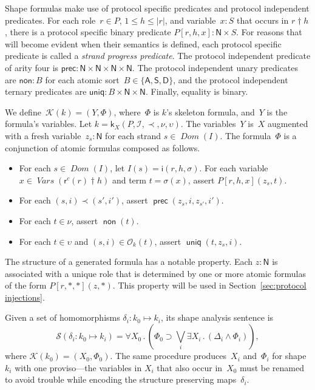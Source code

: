 \documentclass[12pt]{article}
\newcommand{\cn}[1]{\ensuremath{\operatorname{\mathsf{#1}}}}
\newcommand{\fn}[1]{\ensuremath{\operatorname{\mathit{#1}}}}
\newcommand{\srt}[1]{\ensuremath{\mathsf{#1}}}
\newcommand{\typ}{\mathbin:}
\newcommand{\sdom}{\fn{Dom}}
\newcommand{\vars}{\fn{Vars}}
\newcommand{\prefix}[2]{#1\dagger#2}
\newcommand{\all}[1]{\forall#1\mathpunct.}
\newcommand{\some}[1]{\exists#1\mathpunct.}
\newcommand{\form}{\mathcal{K}}
\newcommand{\sent}{\mathcal{S}}
\newcommand{\skel}{\mathsf{k}}
\newcommand{\insta}{\mathsf{i}}
\newcommand{\insts}{\mathcal{I}}
\newcommand{\role}{\mathsf{r}}
\newcommand{\orig}{\mathcal{O}}
\begin{document}
Shape formulas make use of protocol specific predicates and protocol
independent predicates.  For each role~$r\in P$, $1\leq h\leq|r|$, and
variable~$x\typ S$ that occurs in $\prefix{r}{h}$, there is a protocol
specific binary predicate $P[r,h,x]\typ\srt{N}\times S$.  For reasons
that will become evident when their semantics is defined, each
protocol specific predicate is called a \emph{strand progress
  predicate}. The protocol independent predicate of arity four is
$\mathsf{prec}\typ\srt{N}\times\srt{N}\times\srt{N}\times\srt{N}$.
The protocol independent unary predicates are $\mathsf{non}\typ B$ for
each atomic sort~$B\in\{\srt{A}, \srt{S},\srt{D}\}$, and the protocol
independent ternary predicates are $\mathsf{uniq}\typ
B\times\srt{N}\times\srt{N}$.
Finally, equality is binary.

We define~$\form(k)=(Y,\Phi)$, where~$\Phi$ is $k$'s skeleton formula,
and~$Y$ is the formula's variables.  Let
$k=\skel_X(P,\insts,\prec,\nu,\upsilon)$.  The variables~$Y$ is~$X$
augmented with a fresh variable~$z_s\typ\srt{N}$ for each strand
$s\in\sdom(I)$.  The formula~$\Phi$ is a conjunction of atomic
formulas composed as follows.

\begin{itemize}
\item For each $s\in\sdom(I)$, let $I(s)=\insta(r,h,\sigma)$.  For
  each variable $x\in\vars(\prefix{\role^c(r)}{h})$ and term
  $t=\sigma(x)$, assert $P[r,h,x](z_s,t)$.
\item For each $(s,i)\prec(s',i')$, assert
  $\cn{prec}(z_s,i,z_{s'},i')$.
\item For each $t\in\nu$, assert $\cn{non}(t)$.
\item For each $t\in\upsilon$ and $(s,i)\in\orig_k(t)$, assert
  $\cn{uniq}(t,z_s, i)$.
\end{itemize}

The structure of a generated formula has a notable property.  Each
$z\typ\srt{N}$ is associated with a unique role that is determined by
one or more atomic formulas of the form $P[r,\ast,\ast](z,\ast)$.
This property will be used in Section~\ref{sec:protocol injections}.

Given a set of homomorphisms $\delta_i\typ k_0\mapsto k_i$, its shape
analysis sentence is
\begin{equation}\label{eqn:shape sentence}
\sent(\delta_i\typ k_0\mapsto k_i)=\all{X_0}(\Phi_0\supset
\bigvee_i\some{X_i}(\Delta_i\wedge\Phi_i)),
\end{equation}
where $\form(k_0)=(X_0,\Phi_0)$.  The same procedure produces~$X_i$
and~$\Phi_i$ for shape~$k_i$ with one proviso---the variables in
$X_i$ that also occur in~$X_0$ must be renamed to avoid trouble while
encoding the structure preserving maps~$\delta_i$.
\end{document}
